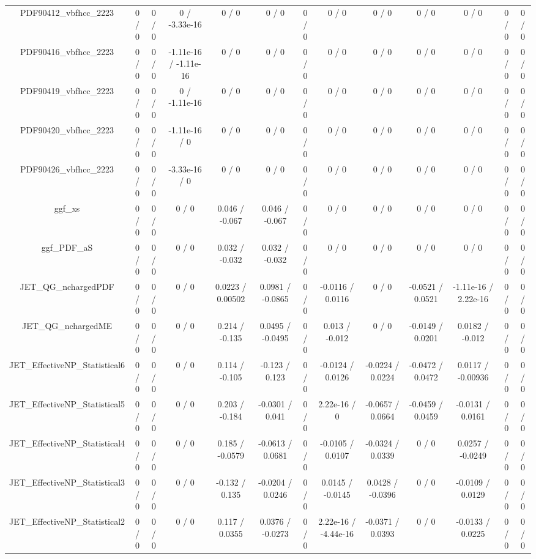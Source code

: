 \documentclass[10pt]{article}
\begin{document}
\begin{table}[htbp]
\begin{center}
\begin{tabular}{|c|c|c|c|c|c|c|c|c|c|c|c|c|}
  PDF90412_vbfhcc_2223 & 0 / 0 & 0 / 0 & 0 / -3.33e-16 & 0 / 0 & 0 / 0 & 0 / 0 & 0 / 0 & 0 / 0 & 0 / 0 & 0 / 0 & 0 / 0 & 0 / 0 \\ 
  PDF90416_vbfhcc_2223 & 0 / 0 & 0 / 0 & -1.11e-16 / -1.11e-16 & 0 / 0 & 0 / 0 & 0 / 0 & 0 / 0 & 0 / 0 & 0 / 0 & 0 / 0 & 0 / 0 & 0 / 0 \\ 
  PDF90419_vbfhcc_2223 & 0 / 0 & 0 / 0 & 0 / -1.11e-16 & 0 / 0 & 0 / 0 & 0 / 0 & 0 / 0 & 0 / 0 & 0 / 0 & 0 / 0 & 0 / 0 & 0 / 0 \\ 
  PDF90420_vbfhcc_2223 & 0 / 0 & 0 / 0 & -1.11e-16 / 0 & 0 / 0 & 0 / 0 & 0 / 0 & 0 / 0 & 0 / 0 & 0 / 0 & 0 / 0 & 0 / 0 & 0 / 0 \\ 
  PDF90426_vbfhcc_2223 & 0 / 0 & 0 / 0 & -3.33e-16 / 0 & 0 / 0 & 0 / 0 & 0 / 0 & 0 / 0 & 0 / 0 & 0 / 0 & 0 / 0 & 0 / 0 & 0 / 0 \\ 
  ggf_xs & 0 / 0 & 0 / 0 & 0 / 0 & 0.046 / -0.067 & 0.046 / -0.067 & 0 / 0 & 0 / 0 & 0 / 0 & 0 / 0 & 0 / 0 & 0 / 0 & 0 / 0 \\ 
  ggf_PDF_aS & 0 / 0 & 0 / 0 & 0 / 0 & 0.032 / -0.032 & 0.032 / -0.032 & 0 / 0 & 0 / 0 & 0 / 0 & 0 / 0 & 0 / 0 & 0 / 0 & 0 / 0 \\ 
  JET_QG_nchargedPDF & 0 / 0 & 0 / 0 & 0 / 0 & 0.0223 / 0.00502 & 0.0981 / -0.0865 & 0 / 0 & -0.0116 / 0.0116 & 0 / 0 & -0.0521 / 0.0521 & -1.11e-16 / 2.22e-16 & 0 / 0 & 0 / 0 \\ 
  JET_QG_nchargedME & 0 / 0 & 0 / 0 & 0 / 0 & 0.214 / -0.135 & 0.0495 / -0.0495 & 0 / 0 & 0.013 / -0.012 & 0 / 0 & -0.0149 / 0.0201 & 0.0182 / -0.012 & 0 / 0 & 0 / 0 \\ 
  JET_EffectiveNP_Statistical6 & 0 / 0 & 0 / 0 & 0 / 0 & 0.114 / -0.105 & -0.123 / 0.123 & 0 / 0 & -0.0124 / 0.0126 & -0.0224 / 0.0224 & -0.0472 / 0.0472 & 0.0117 / -0.00936 & 0 / 0 & 0 / 0 \\ 
  JET_EffectiveNP_Statistical5 & 0 / 0 & 0 / 0 & 0 / 0 & 0.203 / -0.184 & -0.0301 / 0.041 & 0 / 0 & 2.22e-16 / 0 & -0.0657 / 0.0664 & -0.0459 / 0.0459 & -0.0131 / 0.0161 & 0 / 0 & 0 / 0 \\ 
  JET_EffectiveNP_Statistical4 & 0 / 0 & 0 / 0 & 0 / 0 & 0.185 / -0.0579 & -0.0613 / 0.0681 & 0 / 0 & -0.0105 / 0.0107 & -0.0324 / 0.0339 & 0 / 0 & 0.0257 / -0.0249 & 0 / 0 & 0 / 0 \\ 
  JET_EffectiveNP_Statistical3 & 0 / 0 & 0 / 0 & 0 / 0 & -0.132 / 0.135 & -0.0204 / 0.0246 & 0 / 0 & 0.0145 / -0.0145 & 0.0428 / -0.0396 & 0 / 0 & -0.0109 / 0.0129 & 0 / 0 & 0 / 0 \\ 
  JET_EffectiveNP_Statistical2 & 0 / 0 & 0 / 0 & 0 / 0 & 0.117 / 0.0355 & 0.0376 / -0.0273 & 0 / 0 & 2.22e-16 / -4.44e-16 & -0.0371 / 0.0393 & 0 / 0 & -0.0133 / 0.0225 & 0 / 0 & 0 / 0 \\ 

\end{tabular}
\end{center}
\end{table}
\end{document}
